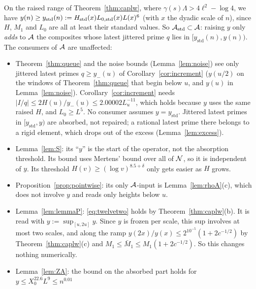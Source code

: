 \begin{lemma}\label{lem:raisedy}
On the raised range of Theorem~\ref{thm:caplw}, where $\gamma(s)\Lambda>4\ell^2-\log4$, we have
$y(n)\ge y_{\mathrm{std}}(n):=H_{\mathrm{std}}(x)L_{0,\mathrm{std}}(x)L(x)^6$ (with $x$ the dyadic scale of $n$), since $H$, $M_1$ and $L_0$ are all at least their
standard values. So $\mathcal{A}_{\mathrm{std}}\subset\mathcal{A}$: raising $y$ only \emph{adds} to $\mathcal{A}$ the composites whose latest
jittered prime $q$ lies in $[y_{\mathrm{std}}(n),y(n))$. The consumers of $\mathcal{A}$ are unaffected:
\begin{itemize}
\item Theorem~\ref{thm:queue} and the noise bounds (Lemma~\ref{lem:noise}) see only jittered latest primes $q\ge y_-(u)$ of
  Corollary~\ref{cor:increment} ($y(u/2)$ on the windows of Theorem~\ref{thm:queue} that begin below $u$, and $y(u)$ in
  Lemma~\ref{lem:noise}). Corollary~\ref{cor:increment} needs $|I/q|\le2H(u)/y_-(u)\le2.00002L_u^{-11}$, which holds because $y$
  uses the same raised $H$, and $L_0\ge L^5$. No consumer assumes $y=y_{\mathrm{std}}$.
  Jittered latest primes in $[y_{\mathrm{std}},y)$ are absorbed, not repaired; a rational latest prime there belongs to a rigid
  element, which drops out of the excess (Lemma~\ref{lem:excess}).
\item Lemma~\ref{lem:S}: its ``$y$'' is the start of the operator, not the absorption threshold. Its bound uses Mertens' bound
  over all of $\mathcal{N}$, so it is independent of $y$. Its threshold $H(v)\ge(\log v)^{8.5+\delta}$ only gets easier as $H$ grows.
\item Proposition~\ref{prop:pointwise}: its only $\mathcal{A}$-input is Lemma~\ref{lem:rhoA}(c), which does not involve $y$ and reads only heights
  below $u$.
\item Lemma~\ref{lem:lemmaP}: \eqref{eq:twelvetwo} holds by Theorem~\ref{thm:caplw}(b). It is read with $y:=\sup_{[u,2u]}y$. Since $y$
  is frozen per scale, this sup involves at most two scales, and along the ramp $y(2x)/y(x)\le2^{10^{-5}}(1+2c^{-1/2})$ by
  Theorem~\ref{thm:caplw}(c) and $M_1\le\bar M_1\le M_1(1+2c^{-1/2})$. So this changes nothing numerically.
\item Lemma~\ref{lem:ZA}: the bound on the absorbed part holds for $y\le X_0^{22.6}L^9\le n^{0.01}$

\end{itemize}
\end{lemma}
